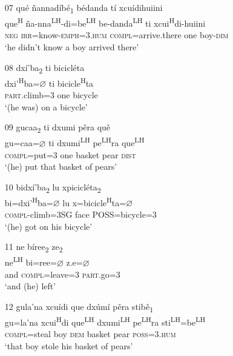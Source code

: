 \begin{itemize}
\item[07]
\glll qu\'{e} \~{n}annad\'{i}b\'{e}\textsubscript{1} b\'{e}danda t\'{i} xcu\'{i}dihuiini \\
que\textsuperscript{H} \~{n}a-nna\textsuperscript{LH}-di=be\textsuperscript{LH}  be-danda\textsuperscript{LH} ti xcui\textsuperscript{H}di-huiini \\
\textsc{neg} \textsc{irr}=know-\textsc{emph}=\textsc{3.hum} \textsc{compl}=arrive.there one boy-\textsc{dim} \\
\glt `he didn't know a boy arrived there'
 

\item[08]
\glll dx\'{i}'ba\textsubscript{2} ti bicicl\'{e}ta  \\
dxi'\textsuperscript{H}ba={$\varnothing$} ti bicicle\textsuperscript{H}ta  \\
\textsc{part}.climb=\textsc{3} one bicycle  \\
\glt `(he was) on a bicycle'


\item[09]
\glll gucaa\textsubscript{2} ti dxumi p\v{e}ra qu\v{e} \\
gu=caa={$\varnothing$} ti dxumi\textsuperscript{LH} pe\textsuperscript{LH}ra que\textsuperscript{LH} \\
\textsc{compl}=put=\textsc{3} one basket pear \textsc{dist} \\
\glt `(he) put that basket of pears'


\item[10]
\glll bidx\'{i}'ba\textsubscript{2} lu xpicicl\'{e}ta\textsubscript{2} \\
bi=dxi'\textsuperscript{H}ba={$\varnothing$} lu x=bicicle\textsuperscript{H}ta={$\varnothing$}  \\
\textsc{compl}-climb=3SG face POSS=bicycle=\textsc{3} \\
\glt `(he) got on his bicycle'

 
 \item[11]
\glll ne b\'{i}ree\textsubscript{2} ze\textsubscript{2} \\
ne\textsuperscript{LH} bi=ree={$\varnothing$} z.e={$\varnothing$} \\
and \textsc{compl}=leave=\textsc{3} \textsc{part}.go=\textsc{3} \\
\glt `and (he) left'


\item[12]
\glll gula'na xcu\'{i}di que dx\'{u}m\'{i} p\v{e}ra stib\v{e}\textsubscript{1} \\
gu=la'na xcui\textsuperscript{H}di que\textsuperscript{LH} dxumi\textsuperscript{LH} pe\textsuperscript{LH}ra sti\textsuperscript{LH}=be\textsuperscript{LH}  \\
\textsc{compl}=steal boy \textsc{dem} basket pear \textsc{poss}=\textsc{3.hum} \\
\glt `that boy stole his basket of pears'



\end{itemize}
